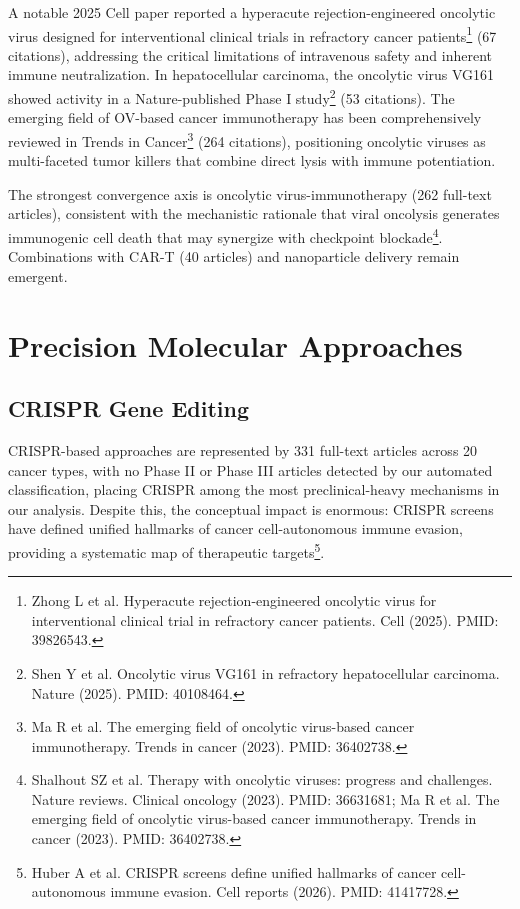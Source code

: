 \documentclass[11pt,twoside,openright]{report}
\begin{document}
A notable 2025 Cell paper reported a hyperacute rejection-engineered oncolytic virus designed for interventional clinical trials in refractory cancer patients\footnote{Zhong L et al. Hyperacute rejection-engineered oncolytic virus for interventional clinical trial in refractory cancer patients. Cell (2025). PMID: 39826543.} (67 citations), addressing the critical limitations of intravenous safety and inherent immune neutralization. In hepatocellular carcinoma, the oncolytic virus VG161 showed activity in a Nature-published Phase I study\footnote{Shen Y et al. Oncolytic virus VG161 in refractory hepatocellular carcinoma. Nature (2025). PMID: 40108464.} (53 citations). The emerging field of OV-based cancer immunotherapy has been comprehensively reviewed in Trends in Cancer\footnote{Ma R et al. The emerging field of oncolytic virus-based cancer immunotherapy. Trends in cancer (2023). PMID: 36402738.} (264 citations), positioning oncolytic viruses as multi-faceted tumor killers that combine direct lysis with immune potentiation.

The strongest convergence axis is oncolytic virus-immunotherapy (262 full-text articles), consistent with the mechanistic rationale that viral oncolysis generates immunogenic cell death that may synergize with checkpoint blockade\footnote{Shalhout SZ et al. Therapy with oncolytic viruses: progress and challenges. Nature reviews. Clinical oncology (2023). PMID: 36631681; Ma R et al. The emerging field of oncolytic virus-based cancer immunotherapy. Trends in cancer (2023). PMID: 36402738.}. Combinations with CAR-T (40 articles) and nanoparticle delivery remain emergent.

\section{Precision Molecular Approaches}

\subsection{CRISPR Gene Editing}

CRISPR-based approaches are represented by 331 full-text articles across 20 cancer types, with no Phase II or Phase III articles detected by our automated classification, placing CRISPR among the most preclinical-heavy mechanisms in our analysis. Despite this, the conceptual impact is enormous: CRISPR screens have defined unified hallmarks of cancer cell-autonomous immune evasion, providing a systematic map of therapeutic targets\footnote{Huber A et al. CRISPR screens define unified hallmarks of cancer cell-autonomous immune evasion. Cell reports (2026). PMID: 41417728.}.
\end{document}
